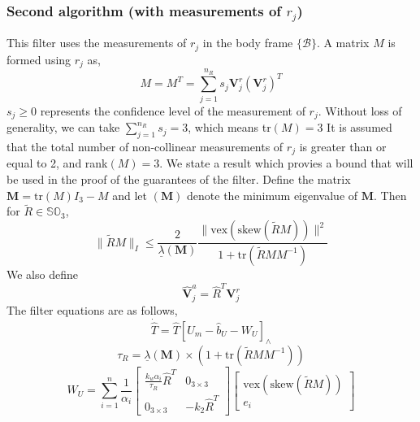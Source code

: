 \documentclass[12pt]{article}
\begin{document}
\subsubsection{Second algorithm (with measurements of $r_j$)}
This filter uses the measurements of $r_j$ in the body frame $\{\mathcal{B}\}$. 
A matrix $M$ is formed using $r_j$ as, 
\begin{equation}
    M = M^T = \sum_{j=1}^{n_R} s_j \mathbf{V}_j^r(\mathbf{V}_j^r)^T
\end{equation}
$s_j \geq 0$ represents the confidence level of the measurement of $r_j$. Without loss 
of generality, we can take $\sum_{j=1}^{n_R}s_j = 3$, which means tr$(M) = 3$
 It is assumed that the total number of non-collinear measurements of $r_j$ is greater than or equal to 2,
and rank$(M) = 3$.
We state a result which provies a bound that will be used in the proof of the guarantees of the filter.
Define the matrix $\mathbf{M} = \text{tr}(M)I_3 - M$ and let  \underbar{$\lambda $}$(\mathbf{M})$ denote 
the minimum eigenvalue of $\mathbf{M}$. Then for $\tilde R \in \mathbb{SO}_3$,
\begin{equation} \label{eq:bound}
    \| \tilde RM \|_I \leq \frac{2}{ \underline{\lambda}(\mathbf{M})} \frac{\|\text{vex}(\text{skew}(\tilde RM)) \|^2}{1 + \text{tr}(\tilde RMM^{-1})}
\end{equation}  
We also define 
\begin{equation}
    \hat {\mathbf{V}}_j^a = \hat R ^T {\mathbf{V}}_j^r
\end{equation}
The filter equations are as follows,
\begin{equation} \label{eq:filter2}
    \dot {\hat T} = \hat T [U_m - \hat b_U -W_U]_\wedge
\end{equation}
\begin{equation}
    \tau_R =  \underline{\lambda}(\mathbf{M}) \times (1 + \text{tr}(\tilde RMM^{-1}))
\end{equation}
\begin{equation}
    W_U = \sum_{i=1}^{n} \frac{1}{\alpha_i}
    \begin{bmatrix}
        \frac{k_w\alpha_i}{\tau_R} \hat R^T & 0_{3 \times 3} \\
        0_{3 \times 3} & - k_2 \hat R^T
    \end{bmatrix}
    \begin{bmatrix}
        \text{vex}(\text{skew}(\tilde{R}M)) \\
        e_i
    \end{bmatrix}
\end{equation}
\end{document}
